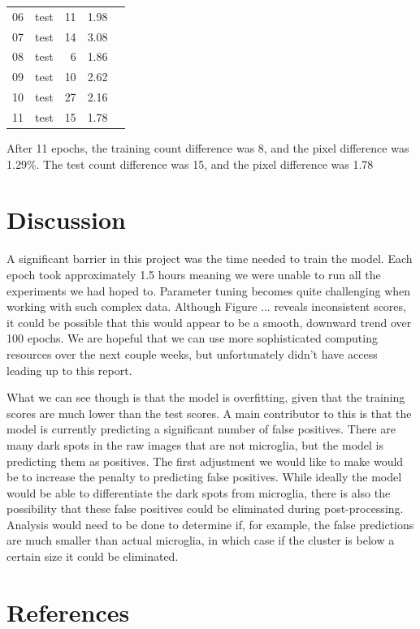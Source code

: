 \documentclass{article}
\begin{document}
\begin{table}
\begin{tabular}{ccrrr}
    06    &   test   &               11 &             1.98 \\
    07    &   test   &               14 &             3.08 \\
    08    &   test   &                6 &             1.86 \\
    09    &   test   &               10 &             2.62 \\
    10    &   test   &               27 &             2.16 \\
    11    &   test   &               15 &             1.78 \\
    \bottomrule
  \end{tabular}
\end{table}

After 11 epochs, the training count difference was 8, and the pixel 
difference was 1.29\%. The test count difference was 15, and the pixel 
difference was 1.78%

\section{Discussion}

A significant barrier in this project was the time needed to train the model. 
Each epoch took approximately 1.5 hours meaning we were unable to run all the 
experiments we had hoped to. Parameter tuning becomes quite challenging when 
working with such complex data. Although Figure ... reveals inconsistent 
scores, it could be possible that this would appear to be a smooth, downward 
trend over 100 epochs. We are hopeful that we can use more sophisticated 
computing resources over the next couple weeks, but unfortunately didn’t have 
access leading up to this report.

What we can see though is that the model is overfitting, given that the 
training scores are much lower than the test scores. A main contributor to 
this is that the model is currently predicting a significant number of false 
positives. There are many dark spots in the raw images that are not microglia,
but the model is predicting them as positives. The first adjustment we would 
like to make would be to increase the penalty to predicting false positives. 
While ideally the model would be able to differentiate the dark spots from 
microglia, there is also the possibility that these false positives could be 
eliminated during post-processing. Analysis would need to be done to 
determine if, for example, the false predictions are much smaller than actual 
microglia, in which case if the cluster is below a certain size it could be 
eliminated.

\section{References}

\printbibliography[heading=none]
\end{document}
